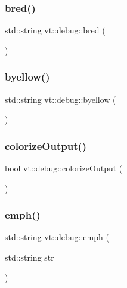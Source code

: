 \subsubsection{\texorpdfstring{bred()}{bred()}}
{\footnotesize\ttfamily std\+::string vt\+::debug\+::bred (\begin{DoxyParamCaption}{ }\end{DoxyParamCaption})\hspace{0.3cm}{\ttfamily [inline]}}

\mbox{\label{namespacevt_1_1debug_afb3aac4faf63d7f2aac0d6d142d0b599}} 
\subsubsection{\texorpdfstring{byellow()}{byellow()}}
{\footnotesize\ttfamily std\+::string vt\+::debug\+::byellow (\begin{DoxyParamCaption}{ }\end{DoxyParamCaption})\hspace{0.3cm}{\ttfamily [inline]}}

\mbox{\label{namespacevt_1_1debug_adf5702c2e0469340d30ee8882848f304}} 
\subsubsection{\texorpdfstring{colorize\+Output()}{colorizeOutput()}}
{\footnotesize\ttfamily bool vt\+::debug\+::colorize\+Output (\begin{DoxyParamCaption}{ }\end{DoxyParamCaption})\hspace{0.3cm}{\ttfamily [inline]}}

\mbox{\label{namespacevt_1_1debug_add365336d7aa2053b5b7588ccad48ac7}} 
\subsubsection{\texorpdfstring{emph()}{emph()}}
{\footnotesize\ttfamily std\+::string vt\+::debug\+::emph (\begin{DoxyParamCaption}\item[{std\+::string}]{str }\end{DoxyParamCaption})\hspace{0.3cm}{\ttfamily [inline]}}

